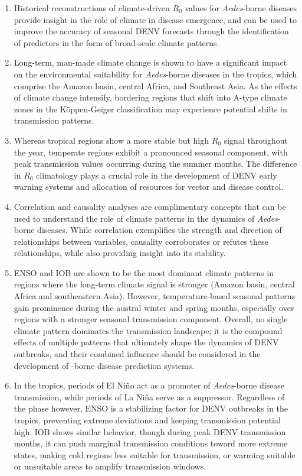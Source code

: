 \documentclass[10pt,twocolumn]{wlscirep}
\begin{document}
\begin{enumerate}
  \item Historical reconstructions of climate-driven $R_0$ values for \textit{Aedes}-borne diseases provide insight in the role of climate in disease emergence, and can be used to improve the accuracy of seasonal DENV forecasts through the identification of predictors in the form of broad-scale climate patterns.
  \item Long-term, man-made climate change is shown to have a significant impact on the environmental suitability for \textit{Aedes}-borne diseases in the tropics, which comprise the Amazon basin, central Africa, and Southeast Asia. As the effects of climate change intensify, bordering regions that shift into A-type climate zones in the Köppen-Geiger classification may experience potential shifts in transmission patterns.
  \item Whereas tropical regions show a more stable but high $R_0$ signal throughout the year, temperate regions exhibit a pronounced seasonal component, with peak transmission values occurring during the summer months. The difference in $R_0$ climatology plays a crucial role in the development of DENV early warning systems and allocation of resources for vector and disease control.
  \item Correlation and causality analyses are complimentary concepts that can be used to understand the role of climate patterns in the dynamics of \textit{Aedes}-borne diseases. While correlation exemplifies the strength and direction of relationships between variables, causality corroborates or refutes these relationships, while also providing insight into its stability.
  \item ENSO and IOB are shown to be the most dominant climate patterns in regions where the long-term climate signal is stronger (Amazon basin, central Africa and southeastern Asia). However, temperature-based seasonal patterns gain prominence during the austral winter and spring months, especially over regions with a stronger seasonal transmission component. Overall, no single climate pattern dominates the transmission landscape; it is the compound effects of multiple patterns that ultimately shape the dynamics of DENV outbreaks, and their combined influence should be considered in the development of -borne disease prediction systems.
  \item In the tropics, periods of El Niño act as a promoter of \textit{Aedes}-borne disease transmission, while periods of La Niña serve as a suppressor. Regardless of the phase however, ENSO is a stabilizing factor for DENV outbreaks in the tropics, preventing extreme deviations and keeping transmission potential high. IOB shows similar behavior, though during peak DENV transmission months, it can push marginal transmission conditions toward more extreme states, making cold regions less suitable for transmission, or warming suitable or unsuitable areas to amplify transmission windows.

\end{enumerate}
\end{document}
